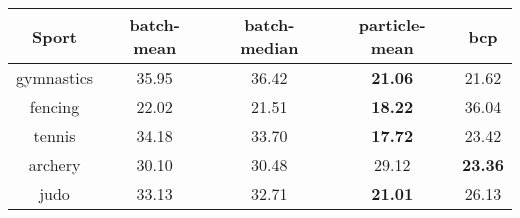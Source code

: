 \begin{tabular}{|c|c|c|c|c|}
\hline
Sport & batch-mean & batch-median & particle-mean & bcp \\
\hline
gymnastics & 35.95 & 36.42 & \textbf{21.06} & 21.62 \\
fencing & 22.02 & 21.51 & \textbf{18.22} & 36.04 \\
tennis & 34.18 & 33.70 & \textbf{17.72} & 23.42 \\
archery & 30.10 & 30.48 & 29.12 & \textbf{23.36} \\
judo & 33.13 & 32.71 & \textbf{21.01} & 26.13 \\
\hline
\end{tabular}
